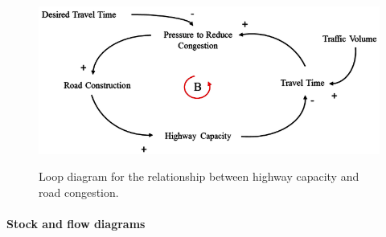 \documentclass[a4paper, landscape, 6pt, fleqn]{scrartcl}
\begin{document}
\begin{multicols*}{4}
\begin{figure}[H]
\centering
\includegraphics[width=1.05 \linewidth]{LoopDiagram}
\label{fig:LoopDiagram}
\caption{Loop diagram for the relationship between highway capacity and road congestion.}
\end{figure}

\paragraph{Stock and flow diagrams}


\end{multicols*}
\end{document}
